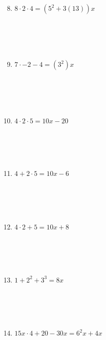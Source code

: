 \documentclass{article}
\begin{document}
\hfill
\begin{minipage}[t]{0.45\textwidth}
    \begin{enumerate}
        \setcounter{enumi}{7} %
        \item $ 8\cdot 2 \cdot 4= (5^2 + 3(13))x$
        \\\\\\\\\\
        \item $ 7 \cdot -2 - 4 = (3^2)x $
        \\\\\\\\\\
        \item $ 4 \cdot 2 \cdot 5 = 10x - 20 $
        \\\\\\\\\\
        \item $ 4 + 2 \cdot 5 = 10x - 6 $
        \\\\\\\\\\
        \item $ 4 \cdot 2 + 5 = 10x + 8 $
        \\\\\\\\\\
        \item $ 1 + 2^2 + 3^3 = 8x$
        \\\\\\\\\\
        \item $15x \cdot 4 + 20 - 30x = 6^2x+4x$
    \end{enumerate}
\end{minipage}
\end{document}
